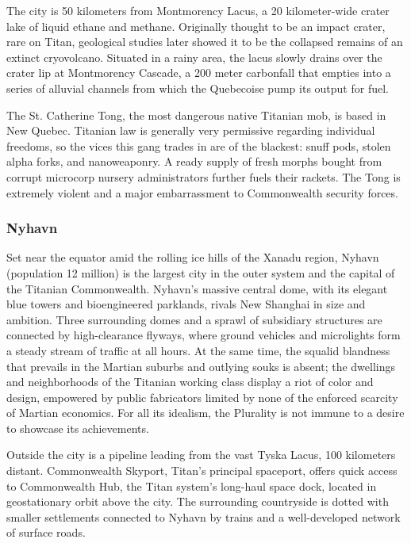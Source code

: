 The city is 50 kilometers from Montmorency Lacus, a 20 kilometer-wide crater lake of liquid ethane and methane. Originally thought to be an impact crater, rare on Titan, geological studies later showed it to be the collapsed remains of an extinct cryovolcano. Situated in a rainy area, the lacus slowly drains over the crater lip at Montmorency Cascade, a 200 meter carbonfall that empties into a series of alluvial channels from which the Quebecoise pump its output for fuel. 

The St. Catherine Tong, the most dangerous native Titanian mob, is based in New Quebec. Titanian law is generally very permissive regarding individual freedoms, so the vices this gang trades in are of the blackest: snuff pods, stolen alpha forks, and nanoweaponry. A ready supply of fresh morphs bought from corrupt microcorp nursery administrators further fuels their rackets. The Tong is extremely violent and a major embarrassment to Commonwealth security forces. 

\subsubsection{Nyhavn} \label{sec:nyhavn} 

Set near the equator amid the rolling ice hills of the Xanadu region, Nyhavn (population 12 million) is the largest city in the outer system and the capital of the Titanian Commonwealth. Nyhavn's massive central dome, with its elegant blue towers and bioengineered parklands, rivals New Shanghai in size and ambition. Three surrounding domes and a sprawl of subsidiary structures are connected by high-clearance flyways, where ground vehicles and microlights form a steady stream of traffic at all hours. At the same time, the squalid blandness that prevails in the Martian suburbs and outlying souks is absent; the dwellings and neighborhoods of the Titanian working class display a riot of color and design, empowered by public fabricators limited by none of the enforced scarcity of Martian economics. For all its idealism, the Plurality is not immune to a desire to showcase its achievements. 

Outside the city is a pipeline leading from the vast Tyska Lacus, 100 kilometers distant. Commonwealth Skyport, Titan's principal spaceport, offers quick access to Commonwealth Hub, the Titan system's long-haul space dock, located in geostationary orbit above the city. The surrounding countryside is dotted with smaller settlements connected to Nyhavn by trains and a well-developed network of surface roads. 

